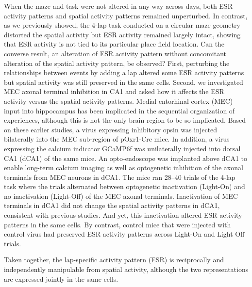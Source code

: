 When the maze and task were not altered in any way across days, both ESR activity patterns and spatial activity patterns remained unperturbed. In contrast, as we previously showed, the 4-lap task conducted on a circular maze geometry distorted the spatial activity but ESR activity remained largely intact, showing that ESR activity is not tied to its particular place field location. Can the converse result, an alteration of ESR activity pattern without concomitant alteration of the spatial activity pattern, be observed? First, perturbing the relationships between events by adding a lap altered some ESR activity patterns but spatial activity was still preserved in the same cells. Second, we investigated MEC axonal terminal inhibition in CA1 and asked how it affects the ESR activity versus the spatial activity patterns. Medial entorhinal cortex (MEC) input into hippocampus has been implicated in the sequential organization of experiences, although this is not the only brain region to be so implicated. Based on these earlier studies, a virus expressing inhibitory opsin was injected bilaterally into the MEC sub-region of pOxr1-Cre mice. In addition, a virus expressing the calcium indicator GCaMP6f was unilaterally injected into dorsal CA1 (dCA1) of the same mice. An opto-endoscope was implanted above dCA1 to enable long-term calcium imaging as well as optogenetic inhibition of the axonal terminals from MEC neurons in dCA1. The mice ran 28--40 trials of the 4-lap task where the trials alternated between optogenetic inactivation (Light-On) and no inactivation (Light-Off) of the MEC axonal terminals. Inactivation of MEC terminals in dCA1 did not change the spatial activity patterns in dCA1, consistent with previous studies. And yet, this inactivation altered ESR activity patterns in the same cells. By contrast, control mice that were injected with control virus had preserved ESR activity patterns across Light-On and Light Off trials.

Taken together, the lap-specific activity pattern (ESR) is reciprocally and independently manipulable from spatial activity, although the two representations are expressed jointly in the same cells.


